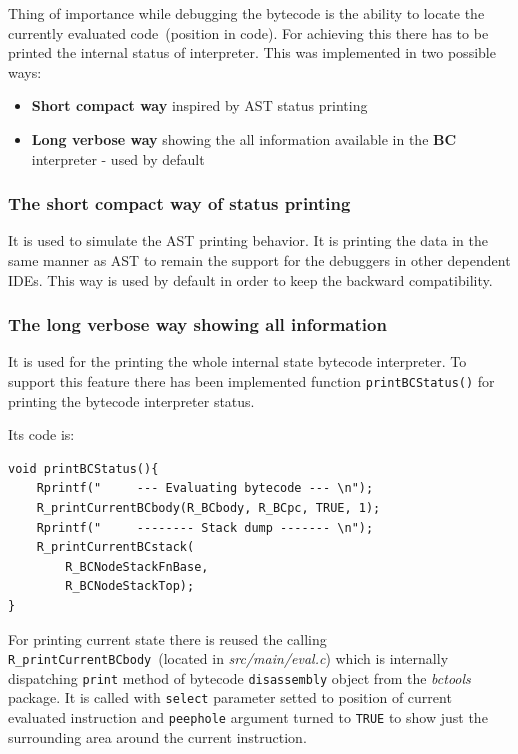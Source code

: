 \documentclass[thesis=M,english]{FITthesis}[2018/10/20]
\newcommand{\code}[1]{\texttt{#1}}
\begin{document}
Thing of importance while debugging the bytecode is the ability to locate the currently evaluated code~(position in code). For achieving this there has to be printed the internal status of interpreter. This was implemented in two possible ways:

\begin{itemize}
	\item \textbf{Short compact way} inspired by AST status printing
	\item \textbf{Long verbose way} showing the all information available in the \textbf{BC} interpreter - used by default
\end{itemize}

\subsubsection{The short compact way of status printing}\label{short-compact-way-of-status-printing}
It is used to simulate the AST printing behavior. It is printing the data in the same manner as AST to remain the support for the debuggers in other dependent IDEs. This way is used by default in order to keep the backward compatibility.

\subsubsection{The long verbose way showing all information}\label{long-verbose-way}
It is used for the printing the whole internal state bytecode interpreter. To support this feature there has been implemented function \code{printBCStatus()} for printing the bytecode interpreter status.

Its code is:
\begin{lstlisting}
void printBCStatus(){
    Rprintf("     --- Evaluating bytecode --- \n");
    R_printCurrentBCbody(R_BCbody, R_BCpc, TRUE, 1);
    Rprintf("     -------- Stack dump ------- \n");
    R_printCurrentBCstack(
    	R_BCNodeStackFnBase, 
    	R_BCNodeStackTop);
}
\end{lstlisting}

For printing current state there is reused the calling \code{R{\_}printCurrentBCbody}~(located in \textit{src/main/eval.c}) which is internally dispatching \code{print} method of bytecode \code{disassembly} object from the \textit{bctools} package. It is called with \code{select} parameter setted to position of current evaluated instruction and \code{peephole} argument turned to \code{TRUE} to show just the surrounding area around the current instruction.
\end{document}
